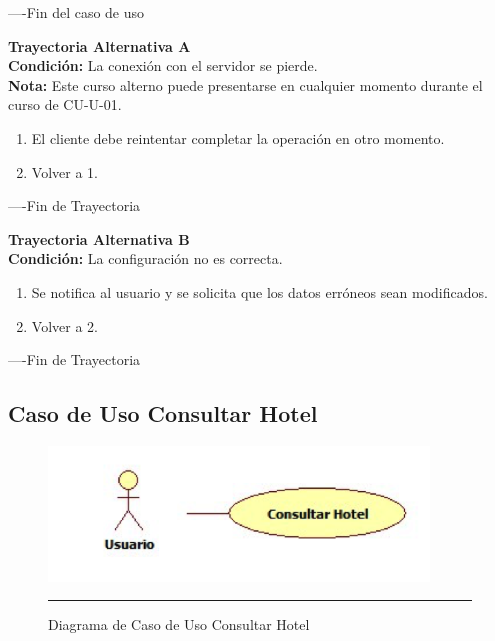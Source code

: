 ----Fin del caso de uso

\begin{flushleft}
	\hypertarget{TrayectoriaA_CU-U-01}{}
	\textbf{Trayectoria Alternativa A}\\
	\textbf{Condición:} La conexión con el servidor se pierde. \\
	\textbf{Nota: } Este curso alterno puede presentarse en cualquier momento durante el curso de CU-U-01.\\
	\begin{enumerate}
		\item El cliente debe reintentar completar la operación en otro momento. 
		\item Volver a 1. 
	\end{enumerate}
\end{flushleft}
----Fin de Trayectoria

\begin{flushleft}
	\hypertarget{TrayectoriaB_CU-U-01}{}
	\textbf{Trayectoria Alternativa B}\\
	\textbf{Condición:} La configuración no es correcta.  \\
	\begin{enumerate}
		\item Se notifica al usuario y se solicita que los datos erróneos sean modificados. 
		\item Volver a 2.
	\end{enumerate}
\end{flushleft}
----Fin de Trayectoria
\newpage
\subsection{Caso de Uso Consultar Hotel}

\begin{figure}[htbp]
	\centering
		\includegraphics[width=0.9\textwidth]{Figuras/cuConsultarHotel.png}
		\rule{30em}{0.5pt}
	\caption[Diagrama de Caso de Uso Consultar Hotel]{Diagrama de Caso de Uso Consultar Hotel}
	\label{fig:cuConsultarHotel}
\end{figure}

